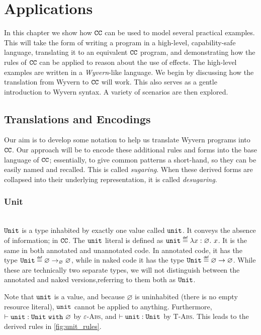 
\section{Applications}

In this chapter we show how $\mathtt{CC}$ can be used to model several practical examples. This will take the form of writing a program in a high-level, capability-safe language, translating it to an equivalent $\mathtt{CC}$ program, and demonstrating how the rules of $\mathtt{CC}$ can be applied to reason about the use of effects. The high-level examples are written in a \textit{Wyvern}-like language. We begin by discussing how the translation from Wyvern to $\mathtt{CC}$ will work. This also serves as a gentle introduction to Wyvern syntax. A variety of scenarios are then explored.


\subsection{Translations and Encodings}

Our aim is to develop some notation to help us translate Wyvern programs into $\mathtt{CC}$. Our approach will be to encode these additional rules and forms into the base language of $\mathtt{CC}$; essentially, to give common patterns a short-hand, so they can be easily named and recalled. This is called \textit{sugaring}. When these derived forms are collapsed into their underlying representation, it is called \textit{desugaring}. \\

\subsubsection{Unit}~\\

$\mathtt{Unit}$ is a type inhabited by exactly one value called $\mathtt{unit}$. It conveys the absence of information; in $\mathtt{CC}$. The $\mathtt{unit}$ literal is defined as $\unit \defn \lambda x: \varnothing.~x$. It is the same in both annotated and unannotated code. In annotated code, it has the type $\Unit \defn \varnothing \rightarrow_{\varnothing} \varnothing$, while in naked code it has the type $\Unit \defn \varnothing \rightarrow \varnothing$. While these are technically two separate types, we will not distinguish between the annotated and naked versions,referring to them both as $\mathtt{Unit}$.

Note that $\mathtt{unit}$ is a value, and because $\varnothing$ is uninhabited (there is no empty resource literal), $\mathtt{unit}$ cannot be applied to anything. Furthermore, $\vdash \mathtt{unit}: \mathtt{Unit}~\mathtt{with}~ \varnothing$ by \textsc{$\varepsilon$-Abs}, and $\vdash \mathtt{unit}: \mathtt{Unit}$ by \textsc{T-Abs}. This leads to the derived rules in \ref{fig:unit_rules}.

